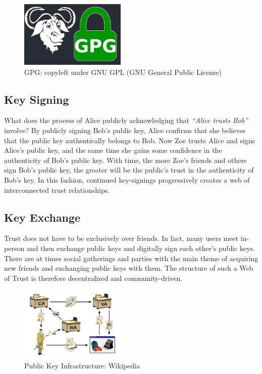 \documentclass[twoside,twocolumn]{article}
\begin{document}
\begin{figure}
\centering
  \includegraphics[width=0.45\textwidth]{i/GNU.jpg}
  \caption{GPG: copyleft under GNU GPL (GNU General Public License) 
  }
\end{figure}


\subsection*{Key Signing}
What does the process of Alice publicly acknowledging that \textit{``Alice trusts Bob''} involve?
By publicly signing Bob's public key,
Alice confirms that she believes that the public key authentically belongs to Bob.
Now Zoe trusts Alice and signs Alice's public key, and the same time
she gains some confidence in the authenticity of Bob's public key.
With time, the more Zoe's friends and others sign Bob's public key,
the greater will be the public's trust in the authenticity of Bob's key.
In this fashion,
continued key-signings progressively creates a web of interconnected trust
relationships.\cite{weboftrust}

\subsection*{Key Exchange}
Trust does not have to be exclusively over friends.
In fact, many users meet in-person and then exchange public keys and digitally sign each other's public keys.
There are at times social gatherings and parties with the main theme of
acquiring new friends and exchanging public keys with them.
The structure of such a Web of Trust is therefore decentralized and
community-driven.\cite{keysigningparty}



\begin{figure}
\centering
  \includegraphics[width=0.45\textwidth]{i/PKIwikipedia.jpg}
  \caption{Public Key Infrastructure: Wikipedia}
\end{figure}
\end{document}
